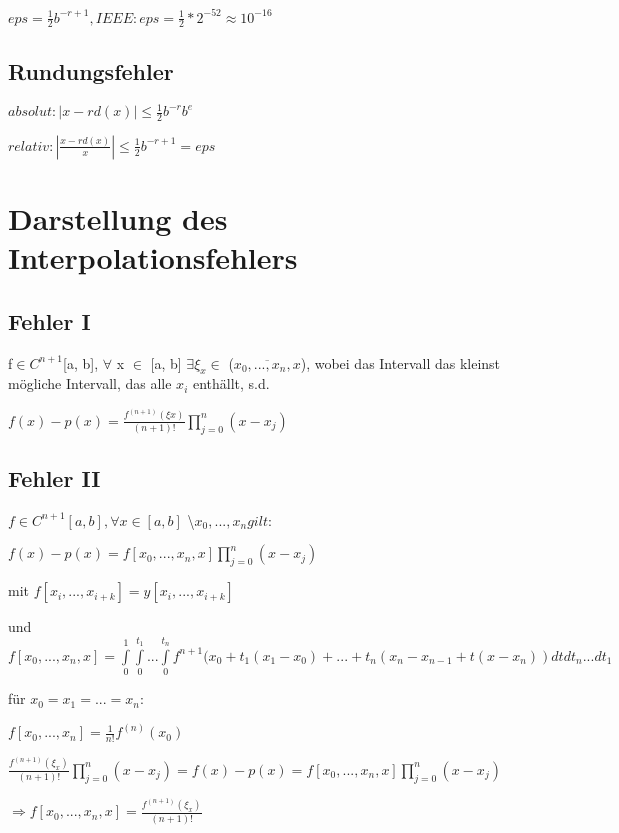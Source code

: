 \documentclass[12pt,a4paper]{article} %
\begin{document}
	$eps = \frac{1}{2}b^{-r + 1}, IEEE: eps = \frac{1}{2} * 2^{-52} \approx 10^{-16}$
	
	\subsection{Rundungsfehler}
	
	$absolut: |x - rd(x)| \le \frac{1}{2}b^{-r}b^e$
	
	$relativ: |\frac{x - rd(x)}{x}| \le \frac{1}{2}b^{-r+1} = eps$
	
	\newpage
	
	\section{Darstellung des Interpolationsfehlers}
	
	\subsection{Fehler I}
	
	f$ \in C^{n+1}$[a, b], $\forall$ x $\in$ [a, b] $\exists \xi_x \in$ ($\overline{x_0, ..., x_n, x}$), wobei das Intervall das kleinst mögliche Intervall, das alle $x_i$ enthällt, s.d.
	
	$f(x) - p(x) = \frac{f^{(n+1)}(\xi x)}{(n+1)!} \prod\limits_{j = 0}^{n}(x - x_j)$
	
	\subsection{Fehler II}
	
	$f \in C^{n + 1}[a, b], \forall x \in [a, b]$ \textbackslash ${x_0, ..., x_n} gilt:$
	
	$f(x) - p(x) = f[x_0, ..., x_n, x] \prod\limits_{j = 0}^{n}(x - x_j)$
	
	mit $f[x_i, ..., x_{i + k}] = y[x_i, ..., x_{i + k}]$
	
	und $f[x_0, ..., x_n, x] = \int\limits_{0}^{1}\int\limits_{0}^{t_1}...\int\limits_{0}^{t_n}f^{n+1}(x_0 + t_1(x_1 - x_0) + ... + t_n(x_n-x_{n - 1} + t(x - x_n))dtdt_n...dt_1$ 
	
	für $x_0 = x_1 = ... = x_n: $
	
	$f[x_0, ..., x_n] = \frac{1}{n!}f^{(n)}(x_0)$
	
	$\frac{f^{(n + 1)}(\xi_x)}{(n + 1)!} \prod\limits_{j = 0}^{n} (x-x_j) = f(x) - p(x) = f[x_0, ..., x_n, x] \prod\limits_{j = 0}^{n}(x - x_j)$
	
	$\Rightarrow f[x_0, ..., x_n, x] = \frac{f^{(n + 1)}(\xi_x)}{(n + 1)!}$
	
\end{document}
